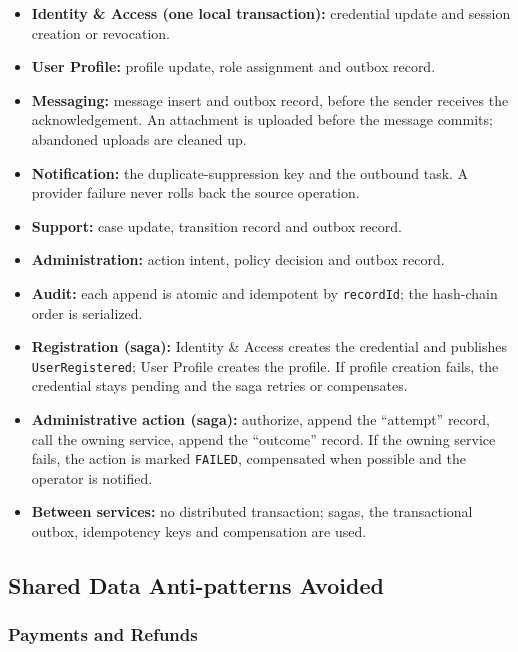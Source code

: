 \begin{itemize}
  \item \textbf{Identity \& Access (one local transaction):} credential
    update and session creation or revocation.
  \item \textbf{User Profile:} profile update, role assignment and outbox
    record.
  \item \textbf{Messaging:} message insert and outbox record, before the
    sender receives the acknowledgement. An attachment is uploaded before the
    message commits; abandoned uploads are cleaned up.
  \item \textbf{Notification:} the duplicate-suppression key and the
    outbound task. A provider failure never rolls back the source operation.
  \item \textbf{Support:} case update, transition record and outbox record.
  \item \textbf{Administration:} action intent, policy decision and outbox
    record.
  \item \textbf{Audit:} each append is atomic and idempotent by
    \texttt{recordId}; the hash-chain order is serialized.
  \item \textbf{Registration (saga):} Identity \& Access creates the
    credential and publishes \texttt{User\allowbreak Registered}; User Profile creates
    the profile. If profile creation fails, the credential stays pending and
    the saga retries or compensates.
  \item \textbf{Administrative action (saga):} authorize, append the
    ``attempt'' record, call the owning service, append the ``outcome''
    record. If the owning service fails, the action is marked
    \texttt{FAILED}, compensated when possible and the operator is notified.
  \item \textbf{Between services:} no distributed transaction; sagas, the
    transactional outbox, idempotency keys and compensation are used.
\end{itemize}
\endgroup

\subsection{Shared Data Anti-patterns Avoided}

\subsubsection{Payments and Refunds}
\label{sec:pay-antipatterns}

